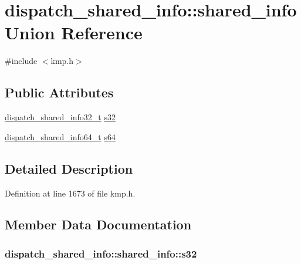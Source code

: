 \hypertarget{uniondispatch__shared__info_1_1shared__info}{\section{dispatch\-\_\-shared\-\_\-info\-:\-:shared\-\_\-info Union Reference}
\label{uniondispatch__shared__info_1_1shared__info}
}


{\ttfamily \#include $<$kmp.\-h$>$}

\subsection*{Public Attributes}
\begin{DoxyCompactItemize}
\item 
\hyperlink{kmp_8h_abcf4c94a5d57bd5b976ad9478fe2ea75}{dispatch\-\_\-shared\-\_\-info32\-\_\-t} \hyperlink{uniondispatch__shared__info_1_1shared__info_aee439b88499939c12958ae2e1598d489}{s32}
\item 
\hyperlink{kmp_8h_a8a97d7549f6b7fa3ec64e933bd434fd5}{dispatch\-\_\-shared\-\_\-info64\-\_\-t} \hyperlink{uniondispatch__shared__info_1_1shared__info_a7fdd3cf5a93b568ae520fba0b416e103}{s64}
\end{DoxyCompactItemize}


\subsection{Detailed Description}


Definition at line 1673 of file kmp.\-h.



\subsection{Member Data Documentation}
\hypertarget{uniondispatch__shared__info_1_1shared__info_aee439b88499939c12958ae2e1598d489}{
\subsubsection[{s32}]{ dispatch\-\_\-shared\-\_\-info\-::shared\-\_\-info\-::s32}}\label{uniondispatch__shared__info_1_1shared__info_aee439b88499939c12958ae2e1598d489}


